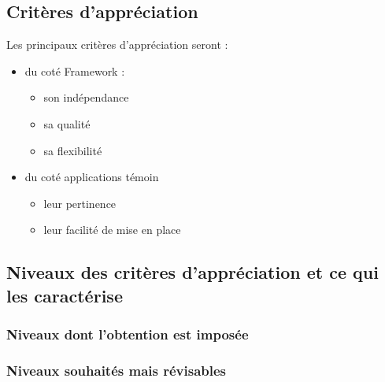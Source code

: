 \subsection{Critères d’appréciation}

Les principaux critères d'appréciation seront : 

\begin{itemize}
 \item du coté Framework :
 \begin{itemize} 
  \item son indépendance
  \item sa qualité
  \item sa flexibilité
 \end{itemize} 
 
 \item du coté applications témoin
 \begin{itemize}
  \item leur pertinence
  \item leur facilité de mise en place
 \end{itemize}
\end{itemize}


\subsection{Niveaux des critères d’appréciation et ce qui les caractérise}
\subsubsection{Niveaux dont l’obtention est imposée}
\subsubsection{Niveaux souhaités mais révisables}
